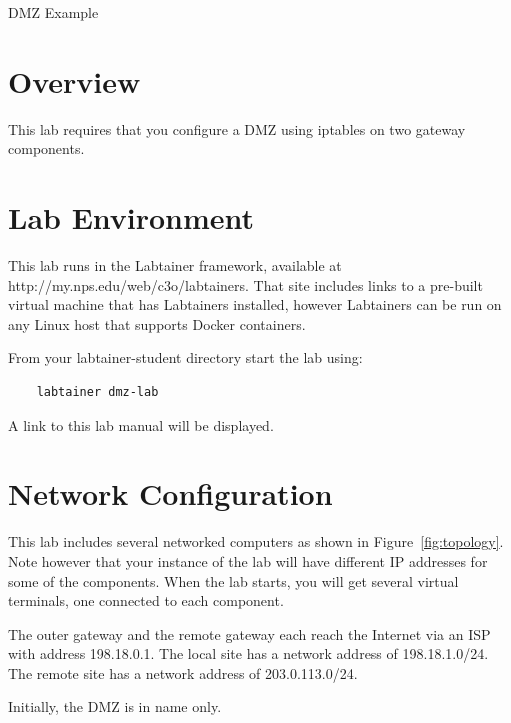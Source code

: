 


\begin{center}
{\LARGE DMZ Example}
\vspace{0.1in}\\
\end{center}

\copyrightnotice

\section{Overview}
This lab requires that you configure a DMZ using iptables on two gateway components.

\section{Lab Environment}
This lab runs in the Labtainer framework,
available at http://my.nps.edu/web/c3o/labtainers.
That site includes links to a pre-built virtual machine
that has Labtainers installed, however Labtainers can
be run on any Linux host that supports Docker containers.

From your labtainer-student directory start the lab using:
\begin{verbatim}
    labtainer dmz-lab
\end{verbatim}
\noindent A link to this lab manual will be displayed.  

\section{Network Configuration}
This lab includes several networked computers as shown in Figure~\ref{fig:topology}.
Note however that your instance of the lab will have different IP addresses
for some of the components.
When the lab starts, you will get several virtual terminals, one connected to each
component.

The outer gateway and the remote gateway each reach the Internet via an ISP with 
address 198.18.0.1.  The local site has a network address of 198.18.1.0/24.  The remote
site has a network address of 203.0.113.0/24.

Initially, the DMZ is in name only.

